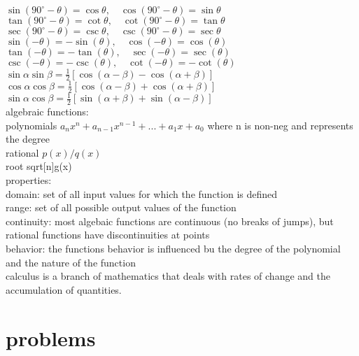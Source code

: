 \documentclass{article}
\begin{document}
$ \sin(90^\circ - \theta) = \cos \theta, \quad \cos(90^\circ - \theta) = \sin \theta $\\

$ \tan(90^\circ - \theta) = \cot \theta, \quad \cot(90^\circ - \theta) = \tan \theta $\\

$ \sec(90^\circ - \theta) = \csc \theta, \quad \csc(90^\circ - \theta) = \sec \theta $\\

$ \sin(-\theta) = -\sin(\theta), \quad \cos(-\theta) = \cos(\theta) $\\

$ \tan(-\theta) = -\tan(\theta), \quad \sec(-\theta) = \sec(\theta) $\\

$ \csc(-\theta) = -\csc(\theta), \quad \cot(-\theta) = -\cot(\theta) $\\

$ \sin \alpha \sin \beta = \frac{1}{2} [\cos(\alpha - \beta) - \cos(\alpha + \beta)] $\\

$ \cos \alpha \cos \beta = \frac{1}{2} [\cos(\alpha - \beta) + \cos(\alpha + \beta)] $\\

$ \sin \alpha \cos \beta = \frac{1}{2} [\sin(\alpha + \beta) + \sin(\alpha - \beta)] $\\
	

algebraic functions:\\
	polynomials $a_nx^n + a_{n-1}x^{n-1} + ... + a_1x + a_0$ where n is non-neg and represents the degree\\
	rational $p(x)/q(x)$\\
	root sqrt[n]{g(x)}\\

	properties:\\
		domain: set of all input values for which the function is defined\\
		range: set of all possible output values of the function\\
	
		continuity: most algebaic functions are continuous (no breaks of jumps), but rational functions have discontinuities at points\\
		
		behavior: the functions behavior is influenced bu the degree of the polynomial and the nature of the function\\

calculus is a branch of mathematics that deals with rates of change and the accumulation of quantities.\\



\section*{problems}	
				
\end{document}

